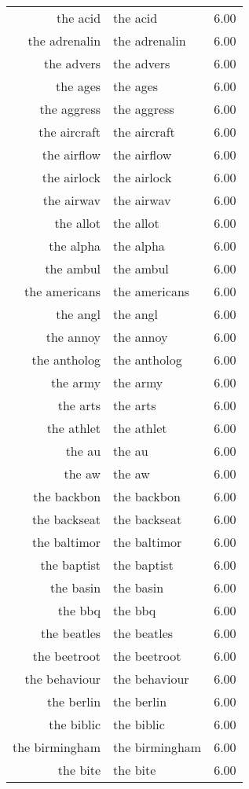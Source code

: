 \begin{table}[ht]
\begin{tabular}{rlr}
  the acid & the acid & 6.00 \\ 
  the adrenalin & the adrenalin & 6.00 \\ 
  the advers & the advers & 6.00 \\ 
  the ages & the ages & 6.00 \\ 
  the aggress & the aggress & 6.00 \\ 
  the aircraft & the aircraft & 6.00 \\ 
  the airflow & the airflow & 6.00 \\ 
  the airlock & the airlock & 6.00 \\ 
  the airwav & the airwav & 6.00 \\ 
  the allot & the allot & 6.00 \\ 
  the alpha & the alpha & 6.00 \\ 
  the ambul & the ambul & 6.00 \\ 
  the americans & the americans & 6.00 \\ 
  the angl & the angl & 6.00 \\ 
  the annoy & the annoy & 6.00 \\ 
  the antholog & the antholog & 6.00 \\ 
  the army & the army & 6.00 \\ 
  the arts & the arts & 6.00 \\ 
  the athlet & the athlet & 6.00 \\ 
  the au & the au & 6.00 \\ 
  the aw & the aw & 6.00 \\ 
  the backbon & the backbon & 6.00 \\ 
  the backseat & the backseat & 6.00 \\ 
  the baltimor & the baltimor & 6.00 \\ 
  the baptist & the baptist & 6.00 \\ 
  the basin & the basin & 6.00 \\ 
  the bbq & the bbq & 6.00 \\ 
  the beatles & the beatles & 6.00 \\ 
  the beetroot & the beetroot & 6.00 \\ 
  the behaviour & the behaviour & 6.00 \\ 
  the berlin & the berlin & 6.00 \\ 
  the biblic & the biblic & 6.00 \\ 
  the birmingham & the birmingham & 6.00 \\ 
  the bite & the bite & 6.00 \\ 

\end{tabular}
\end{table}
